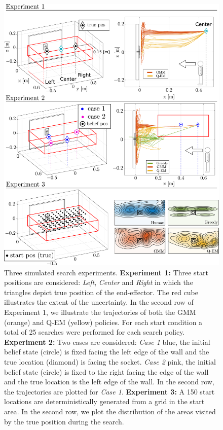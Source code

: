 \begin{figure}
    \centering
    \hspace*{-1.4cm}
    \includegraphics[width=1.2\textwidth]{./ch4-PiH/Figures/Fig/experiment_final_v3.pdf}
    \caption{Three simulated search experiments. \textbf{Experiment 1:} Three start positions are considered: \textit{Left}, \textit{Center} and
     \textit{Right} in which the triangles depict true position of the end-effector. The red cube illustrates the extent of the uncertainty. 
     In the second row of Experiment 1, we illustrate the trajectories of both the GMM (orange) and Q-EM (yellow) policies. For each start condition 
     a total of 25 searches were performed for each search policy. 
     \textbf{Experiment 2:} Two cases are considered: \textit{Case 1} blue, the initial belief state (circle) is fixed facing 
     the left edge of the wall and the true location (diamond) is facing the socket.
     \textit{Case 2} pink, the initial belief state (circle) is fixed to the right facing the edge of the wall and the 
     true location is the left edge of the wall. In the second row, the trajectories are plotted for \textit{Case 1}.
     \textbf{Experiment 3:} A 150 start locations are deterministically generated from a 
     grid in the start area. In the second row, we plot the distribution of the areas visited by the true position during the search.}
    \label{fig:box_exp_sim}
\end{figure}

